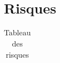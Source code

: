 \section{Risques}
	\label{sec:risques}

	\begin{table}
		\centering
		\begin{tabular}{|l|c|c|l|}

		\end{tabular}
		\caption{Tableau des risques}
		\label{fig:risques}
	\end{table}